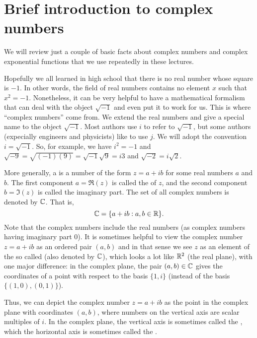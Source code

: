 \medskip

\appendix

\section{Brief introduction to complex numbers}
\label{sec:very-brief-intr}
We will review just a couple of basic facts about complex numbers 
and complex exponential functions that we use repeatedly 
in these lectures.

Hopefully we all learned in high school that there is no real number whose 
square is $-1$.  In other words, the field of real numbers contains no element 
$x$ such that $x^2 = -1$.
Nonetheless, it can be very helpful to have a mathematical formalism that 
can deal with the object $\sqrt{-1}$ and even put it to work for us.
This is where ``complex numbers'' come from.
We extend the real numbers and give a special name to 
the object $\sqrt{-1}$.  Most authors use $i$ to refer to $\sqrt{-1}$, but some 
authors (expecially engineers and physicists) like to use $j$. 
We will adopt the convention  $i = \sqrt{-1}$.  So, for example, we have
$i^2 = -1$ and $\sqrt{-9} = \sqrt{(-1)(9)} = \sqrt{-1}\sqrt{9} = i3$ 
and $\sqrt{-2} = i\sqrt{2}$.

More generally, a  is a number of the form 
$z = a + ib$ for some real numbers $a$ and $b$. 
The first component $a = \Re(z)$ is called the  of $z$, 
and the second component $b = \Im(z)$ is called the imaginary part.
The set of all complex numbers is denoted by $\mathbb C$.  That is,
\[
\mathbb C = \{a + i b : a, b \in \mathbb R\}.
\]
Note that the complex numbers include the real numbers 
(as complex numbers having imaginary part 0).
It is sometimes helpful to view the complex number $z = a + ib$ 
as an ordered pair $(a,b)$ and in that sense we see
$z$ as an element of the so called  (also denoted by $\mathbb C$),
which looks a lot like $\mathbb R^2$ (the real plane), with one major difference:
in the complex plane, the pair $(a,b)\in \mathbb C$ gives
the coordinates of a point with respect to the basis $\{1, i\}$ (instead of the 
basis $\{(1,0), (0,1)\}$).

Thus, we can depict the complex number $z = a+ib$
as the point in the complex plane with coordinates 
$(a,b)$, where numbers on the vertical axis 
are scalar multiples of $i$.
In the complex plane,
the vertical axis is sometimes called the , 
which the horizontal axis is sometimes called the .

